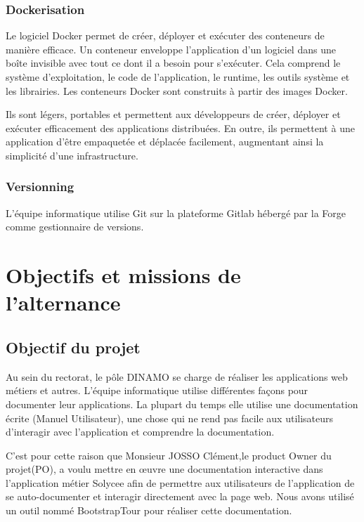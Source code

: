 \documentclass[a4paper]{article}
\begin{document}
\subsubsection{Dockerisation}

Le logiciel Docker permet de créer, déployer et exécuter des conteneurs de manière efficace. Un conteneur enveloppe l’application d’un logiciel dans une boîte invisible avec tout ce dont il a besoin pour s’exécuter. Cela comprend le
système d’exploitation, le code de l’application, le runtime, les outils système et les librairies. Les conteneurs Docker sont construits à partir des images Docker.

Ils sont légers, portables et permettent aux développeurs de créer, déployer et exécuter efficacement des applications distribuées. En outre, ils permettent à une application d’être empaquetée et déplacée facilement, augmentant ainsi la simplicité d’une infrastructure.

\subsubsection{Versionning}

L'équipe informatique utilise Git sur la plateforme Gitlab hébergé par la Forge comme gestionnaire de versions. 


\section{Objectifs et missions de l'alternance}

\subsection{Objectif du projet}

Au sein du rectorat, le pôle DINAMO se charge de réaliser les applications web métiers et autres. L'équipe informatique utilise différentes façons pour documenter leur applications. La plupart du temps elle utilise une documentation écrite (Manuel Utilisateur), une chose qui ne rend pas facile aux utilisateurs d’interagir avec l'application et comprendre la documentation. 


C'est pour cette raison que Monsieur JOSSO Clément,le product Owner du projet(PO), a voulu mettre en œuvre une documentation interactive dans l'application métier Solycee afin de permettre aux utilisateurs de l'application de se auto-documenter et interagir directement avec la page web. Nous avons utilisé un outil nommé BootstrapTour pour réaliser cette documentation. 
\end{document}
